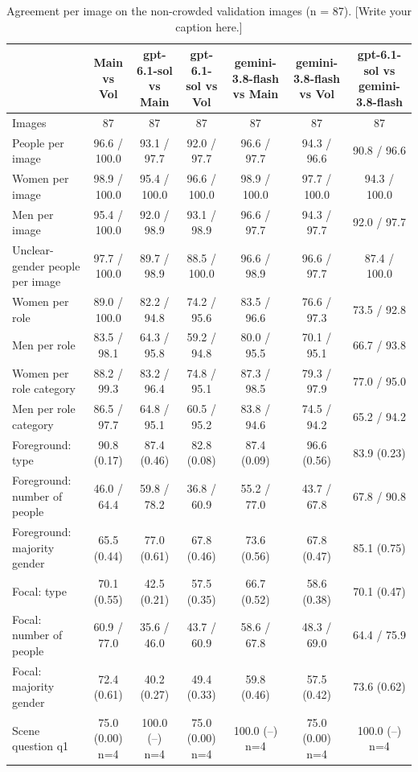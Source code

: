 \begin{table}[t]
\centering
\scriptsize
\begin{tabular}{@{}lcccccc@{}}
\toprule
 & \textbf{Main vs Vol} & \textbf{gpt-6.1-sol vs Main} & \textbf{gpt-6.1-sol vs Vol} & \textbf{gemini-3.8-flash vs Main} & \textbf{gemini-3.8-flash vs Vol} & \textbf{gpt-6.1-sol vs gemini-3.8-flash} \\
\midrule
Images & 87 & 87 & 87 & 87 & 87 & 87 \\
People per image & 96.6 / 100.0 & 93.1 / 97.7 & 92.0 / 97.7 & 96.6 / 97.7 & 94.3 / 96.6 & 90.8 / 96.6 \\
Women per image & 98.9 / 100.0 & 95.4 / 100.0 & 96.6 / 100.0 & 98.9 / 100.0 & 97.7 / 100.0 & 94.3 / 100.0 \\
Men per image & 95.4 / 100.0 & 92.0 / 98.9 & 93.1 / 98.9 & 96.6 / 97.7 & 94.3 / 97.7 & 92.0 / 97.7 \\
Unclear-gender people per image & 97.7 / 100.0 & 89.7 / 98.9 & 88.5 / 100.0 & 96.6 / 98.9 & 96.6 / 97.7 & 87.4 / 100.0 \\
Women per role & 89.0 / 100.0 & 82.2 / 94.8 & 74.2 / 95.6 & 83.5 / 96.6 & 76.6 / 97.3 & 73.5 / 92.8 \\
Men per role & 83.5 / 98.1 & 64.3 / 95.8 & 59.2 / 94.8 & 80.0 / 95.5 & 70.1 / 95.1 & 66.7 / 93.8 \\
Women per role category & 88.2 / 99.3 & 83.2 / 96.4 & 74.8 / 95.1 & 87.3 / 98.5 & 79.3 / 97.9 & 77.0 / 95.0 \\
Men per role category & 86.5 / 97.7 & 64.8 / 95.1 & 60.5 / 95.2 & 83.8 / 94.6 & 74.5 / 94.2 & 65.2 / 94.2 \\
Foreground: type & 90.8 (0.17) & 87.4 (0.46) & 82.8 (0.08) & 87.4 (0.09) & 96.6 (0.56) & 83.9 (0.23) \\
Foreground: number of people & 46.0 / 64.4 & 59.8 / 78.2 & 36.8 / 60.9 & 55.2 / 77.0 & 43.7 / 67.8 & 67.8 / 90.8 \\
Foreground: majority gender & 65.5 (0.44) & 77.0 (0.61) & 67.8 (0.46) & 73.6 (0.56) & 67.8 (0.47) & 85.1 (0.75) \\
Focal: type & 70.1 (0.55) & 42.5 (0.21) & 57.5 (0.35) & 66.7 (0.52) & 58.6 (0.38) & 70.1 (0.47) \\
Focal: number of people & 60.9 / 77.0 & 35.6 / 46.0 & 43.7 / 60.9 & 58.6 / 67.8 & 48.3 / 69.0 & 64.4 / 75.9 \\
Focal: majority gender & 72.4 (0.61) & 40.2 (0.27) & 49.4 (0.33) & 59.8 (0.46) & 57.5 (0.42) & 73.6 (0.62) \\
Scene question q1 & 75.0 (0.00) n=4 & 100.0 (--) n=4 & 75.0 (0.00) n=4 & 100.0 (--) n=4 & 75.0 (0.00) n=4 & 100.0 (--) n=4 \\
\bottomrule
\end{tabular}
\caption{Agreement per image on the non-crowded validation images (n = 87). [Write your caption here.]}
\label{tab:human-validation}
\end{table}
